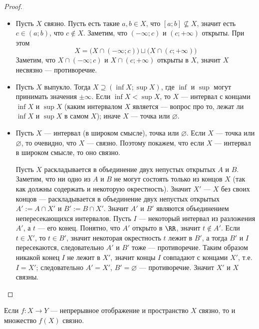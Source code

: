 \documentclass[12pt,a4paper]{article}
\begin{document}
    \begin{proof}
        \begin{itemize}
            \item Пусть $X$ связно. Пусть есть такие $a, b \in X$, что $[a; b] \nsubseteq X$, значит есть $c \in (a; b)$, что $c \notin X$. Заметим, что $(-\infty; c)$ и $(c; +\infty)$ открыты. При этом
                \[X = \bigl(X \cap (-\infty; c)\bigr) \sqcup \bigl(X \cap (c; +\infty)\bigr)\]
                Заметим, что $X \cap (-\infty; c)$ и $X \cap (c; +\infty)$ открыты в $X$, значит $X$ несвязно --- противоречие.

            \item Пусть $X$ выпукло. Тогда $X \supseteq (\inf X; \sup X)$, где $\inf$ и $\sup$ могут принимать значения $\pm \infty$. Если $\inf X < \sup X$, то $X$ --- интервал с концами $\inf X$ и $\sup X$ (каким интервалом $X$ является --- вопрос про то, лежат ли $\inf X$ и $\sup X$ в самом $X$); иначе $X$ --- точка или $\varnothing$.

            \item Пусть $X$ --- интервал (в широком смысле), точка или $\varnothing$. Если $X$ --- точка или $\varnothing$, то очевидно, что $X$ --- связно. Поэтому покажем, что если $X$ --- интервал в широком смысле, то оно связно.

                Пусть $X$ раскладывается в объединение двух непустых открытых $A$ и $B$. Заметим, что ни одно из $A$ и $B$ не могут состоять только из концов $X$ (так как должны содержать и некоторую окрестность). Значит $X'$ --- $X$ без своих концов --- раскладывается в объединение двух непустых открытых $A' := A \cap X'$ и $B' := B \cap X'$. Значит $A'$ и $B'$ являются объединением непересекающихся интервалов. Пусть $I$ --- некоторый интервал из разложения $A'$, а $t$ --- его конец. Понятно, что $A'$ открыто в $\RR$, значит $t \notin A'$. Если $t \in X'$, то $t \in B'$, значит некоторая окрестность $t$ лежит в $B'$, а тогда $B'$ и $I$ пересекаются, следовательно $A'$ и $B'$ тоже --- противоречие. Таким образом никакой конец $I$ не лежит в $X'$, значит концы $I$ совпадают с концами $X'$, т.е. $I = X'$; следовательно $A' = X'$, $B' = \varnothing$ --- противоречие. Значит $X'$ и $X$ связны.
        \end{itemize}
    \end{proof}

    \begin{theorem}
        Если $f: X \to Y$ --- непрерывное отображение и пространство $X$ связно, то и множество $f(X)$ связно.
    \end{theorem}
\end{document}
